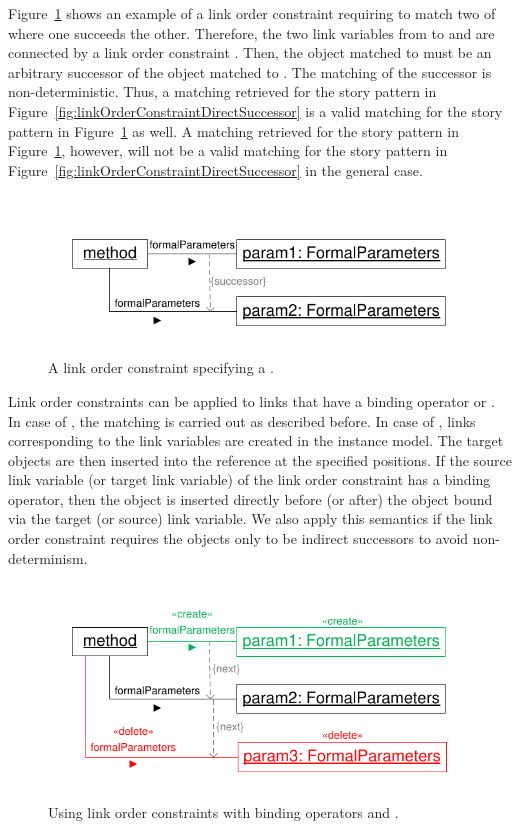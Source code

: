 {Figure~\ref{fig:linkOrderConstraintSuccessor} shows an example of a link order constraint requiring to match two  of  where one succeeds the other. Therefore, the two link variables from  to  and  are connected by a link order constraint . Then, the object matched to  must be an arbitrary successor of the object matched to . The matching of the successor is non-deterministic. Thus, a matching retrieved for the story pattern in Figure~\ref{fig:linkOrderConstraintDirectSuccessor} is a valid matching for the story pattern in Figure~\ref{fig:linkOrderConstraintSuccessor} as well. A matching retrieved for the story pattern in Figure~\ref{fig:linkOrderConstraintSuccessor}, however, will not be a valid matching for the story pattern in Figure~\ref{fig:linkOrderConstraintDirectSuccessor} in the general case.

\begin{figure}[htbp]
\center
\includegraphics[width=0.75\columnwidth]{figures/LinkOrderConstraintSuccessor}
\caption{A link order constraint specifying a .}
\label{fig:linkOrderConstraintSuccessor}
\end{figure}

Link order constraints can be applied to links that have a binding operator \create or \destroy. In case of \destroy, the matching is carried out as described before. In case of \create, links corresponding to the link variables are created in the instance model. The target objects are then inserted into the reference at the specified positions. If the source link variable (or target link variable) of the link order constraint has a \create binding operator, then the object is inserted directly before (or after) the object bound via the target (or source) link variable. We also apply this semantics if the link order constraint requires the objects only to be indirect successors to avoid non-determinism.

\begin{figure}[htbp]
\center
\includegraphics[width=0.75\columnwidth]{figures/LinkOrderConstraintDirectSuccessorCreateDelete}
\caption{Using link order constraints with binding operators \create and \destroy.}
\label{fig:linkOrderConstraintDirectSuccessorCreateDelete}
\end{figure}

}
